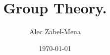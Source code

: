 \documentclass[12pt, twoside]{book}
\title{Group Theory.}
\author{Alec Zabel-Mena}
\date{\today}
\theoremstyle{plain}
\theoremstyle{definition}
\theoremstyle{remark}
\begin{document}
\maketitle
\tableofcontents
\newpage






\nocite{*}



\end{document}
